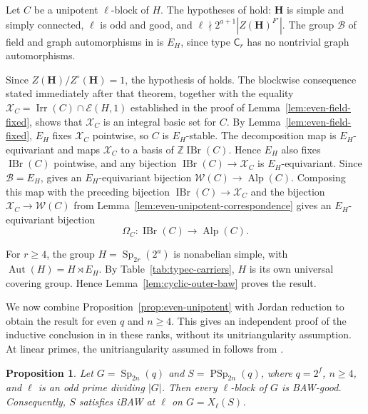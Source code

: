 \documentclass[10pt]{amsart}
\newtheorem{proposition}[theorem]{Proposition}
\theoremstyle{definition}
\renewcommand{\geq}{\geqslant}
\let\oldendproof\endproof
\renewenvironment{proof}[1][\proofname]{%
  \oldproof[\bfseries #1]%
}{\oldendproof}
\DeclareMathOperator{\Aut}{Aut}
\DeclareMathOperator{\IBr}{IBr}
\DeclareMathOperator{\Irr}{Irr}
\DeclareMathOperator{\Alp}{Alp}
\DeclareMathOperator{\Sp}{Sp}
\DeclareMathOperator{\PSp}{PSp}
\numberwithin{equation}{section}
\numberwithin{table}{section}
\begin{document}
\begin{proof}
Let $C$ be a unipotent $\ell$-block of $H$.
The hypotheses of \cite[Condition~6.1]{FengMalleZhang2026} hold:
$\mathbf H$ is simple and simply connected, $\ell$ is odd and good, and
$\ell\nmid 2^{a+1}|Z(\mathbf H)^{F'}|$.
The group $\mathcal B$ of field and graph automorphisms in
\cite[Condition~6.1]{FengMalleZhang2026} is $E_H$, since type
$\mathsf C_r$ has no nontrivial graph automorphisms.

Since $Z(\mathbf H)/Z^\circ(\mathbf H)=1$, the hypothesis of
\cite[Theorem~A]{Geck1993} holds.  The blockwise consequence stated
immediately after that theorem, together with the equality
$\mathcal X_C=\Irr(C)\cap\mathcal E(H,1)$ established in the proof of
Lemma~\ref{lem:even-field-fixed}, shows that $\mathcal X_C$ is an integral
basic set for $C$.  By Lemma~\ref{lem:even-field-fixed}, $E_H$ fixes
$\mathcal X_C$ pointwise, so $C$ is $E_H$-stable.
The decomposition map is $E_H$-equivariant and maps $\mathcal X_C$ to a
basis of $\mathbb Z\IBr(C)$.  Hence $E_H$ also fixes $\IBr(C)$ pointwise,
and any bijection $\IBr(C)\longrightarrow\mathcal X_C$ is $E_H$-equivariant.  Since
$\mathcal B=E_H$,
  \cite[Theorem~6.2]{FengMalleZhang2026} gives an
$E_H$-equivariant bijection $\mathcal W(C)\longrightarrow\Alp(C)$.
Composing this map with the preceding bijection
$\IBr(C)\longrightarrow\mathcal X_C$ and the bijection
$\mathcal X_C\longrightarrow\mathcal W(C)$ from
Lemma~\ref{lem:even-unipotent-correspondence} gives an $E_H$-equivariant
bijection
\[
  \Omega_C:\IBr(C)\longrightarrow\Alp(C).
\]

For $r\geq4$, the group $H=\Sp_{2r}(2^a)$ is nonabelian simple,
with $\Aut(H)=H\rtimes E_H$.
By Table~\ref{tab:typec-carriers}, $H$ is its own universal covering
group.  Hence Lemma~\ref{lem:cyclic-outer-baw} proves the result.
\end{proof}

We now combine Proposition~\ref{prop:even-unipotent} with Jordan reduction
to obtain the result for even $q$ and $n\geq4$. This gives an independent
proof of the inductive conclusion in \cite[Theorem~3]{Li2021} in these
ranks, without its unitriangularity assumption.
At linear primes, the unitriangularity assumed in \cite[Theorem~3]{Li2021}
follows from \cite[Theorem~8.2]{GruberHiss1997}.

\begin{proposition}\label{prop:even-bridge}
Let $G=\Sp_{2n}(q)$ and $S=\PSp_{2n}(q)$, where $q=2^f$, $n\geq4$,
and $\ell$ is an odd prime dividing $|G|$.
Then every $\ell$-block of $G$ is BAW-good.
Consequently, $S$ satisfies iBAW at $\ell$ on $G=X_\ell(S)$.
\end{proposition}
\end{document}
